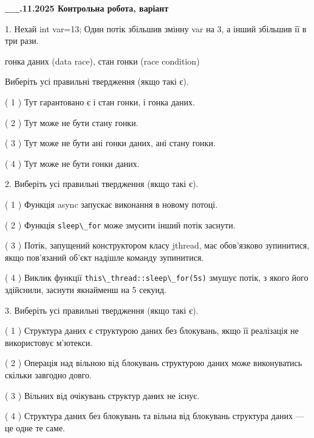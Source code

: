 \documentclass[12pt, ukrainian]{article}
\def\code#1{\Verb!#1!}
\begin{document}
\newpage
\begin {large}

\textbf{\_\_.11.2025 Контрольна робота, варіант  }\par


{
1. Нехай int var=13; Один потік збільшив змінну var на 3, а інший збільшив її в три рази.

гонка даних (data race), стан гонки (race condition)

Виберіть усі правильні твердження (якщо такі є).\par
\vspace{2mm}
( 1 ) Тут гарантовано є і стан гонки, і гонка даних.%

( 2 ) Тут може не бути стану гонки.%

( 3 ) Тут може не бути ані гонки даних, ані стану гонки.%

( 4 ) Тут може не бути гонки даних.%


2. Виберіть усі правильні твердження (якщо такі є).\par
\vspace{2mm}

( 1 ) Функція async запускає виконання в новому потоці.%

( 2 ) Функція \code{sleep\_for} може змусити інший потік заснути.%

( 3 ) Потік, запущений конструктором класу jthread, має обов’язково зупинитися, якщо пов’язаний об’єкт надішле команду зупинитися.%

( 4 ) Виклик функції \code{this\_thread::sleep\_for(5s)} змушує потік, з якого його здійснили, заснути якнайменш на 5 секунд.%


3. Виберіть усі правильні твердження (якщо такі є).\par
\vspace{2mm}

( 1 ) Структура даних є структурою даних без блокувань, якщо її реалізація не використовує м’ютекси.%

( 2 ) Операція над вільною від блокувань структурою даних може виконуватись скільки завгодно довго.%

( 3 ) Вільних від очікувань структур даних не існує.%

( 4 ) Структура даних без блокувань та вільна від блокувань структура даних --- це одне те саме.%


}
\end{large}
\end{document}
